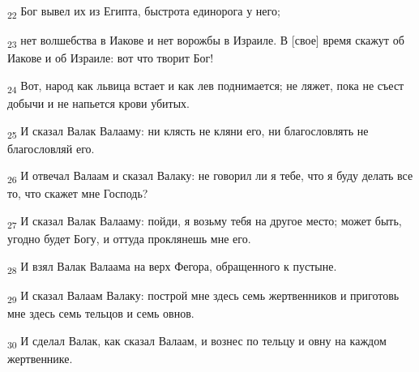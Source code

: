 \begin{tcolorbox}
\textsubscript{22} Бог вывел их из Египта, быстрота единорога у него;
\end{tcolorbox}
\begin{tcolorbox}
\textsubscript{23} нет волшебства в Иакове и нет ворожбы в Израиле. В [свое] время скажут об Иакове и об Израиле: вот что творит Бог!
\end{tcolorbox}
\begin{tcolorbox}
\textsubscript{24} Вот, народ как львица встает и как лев поднимается; не ляжет, пока не съест добычи и не напьется крови убитых.
\end{tcolorbox}
\begin{tcolorbox}
\textsubscript{25} И сказал Валак Валааму: ни клясть не кляни его, ни благословлять не благословляй его.
\end{tcolorbox}
\begin{tcolorbox}
\textsubscript{26} И отвечал Валаам и сказал Валаку: не говорил ли я тебе, что я буду делать все то, что скажет мне Господь?
\end{tcolorbox}
\begin{tcolorbox}
\textsubscript{27} И сказал Валак Валааму: пойди, я возьму тебя на другое место; может быть, угодно будет Богу, и оттуда проклянешь мне его.
\end{tcolorbox}
\begin{tcolorbox}
\textsubscript{28} И взял Валак Валаама на верх Фегора, обращенного к пустыне.
\end{tcolorbox}
\begin{tcolorbox}
\textsubscript{29} И сказал Валаам Валаку: построй мне здесь семь жертвенников и приготовь мне здесь семь тельцов и семь овнов.
\end{tcolorbox}
\begin{tcolorbox}
\textsubscript{30} И сделал Валак, как сказал Валаам, и вознес по тельцу и овну на каждом жертвеннике.
\end{tcolorbox}
